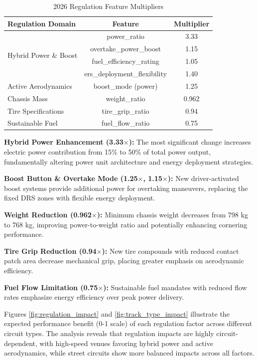 \documentclass[conference]{IEEEtran}
\begin{document}
\begin{table}[h]
\centering
\caption{2026 Regulation Feature Multipliers}
\begin{tabular}{lcc}
\toprule
\textbf{Regulation Domain} & \textbf{Feature} & \textbf{Multiplier} \\
\midrule
\multirow{4}{*}{Hybrid Power \& Boost} & power\_ratio & 3.33 \\
& overtake\_power\_boost & 1.15 \\
& fuel\_efficiency\_rating & 1.05 \\
& ers\_deployment\_flexibility & 1.40 \\
\midrule
Active Aerodynamics & boost\_mode (power) & 1.25 \\
\midrule
Chassis Mass & weight\_ratio & 0.962 \\
\midrule
Tire Specifications & tire\_grip\_ratio & 0.94 \\
\midrule
Sustainable Fuel & fuel\_flow\_ratio & 0.75 \\
\bottomrule
\end{tabular}
\label{tab:regulation_multipliers}
\end{table}

\textbf{Hybrid Power Enhancement (3.33$\times$):} The most significant change increases electric power contribution from 15\% to 50\% of total power output, fundamentally altering power unit architecture and energy deployment strategies.

\textbf{Boost Button \& Overtake Mode (1.25$\times$, 1.15$\times$):} New driver-activated boost systems provide additional power for overtaking maneuvers, replacing the fixed DRS zones with flexible energy deployment.

\textbf{Weight Reduction (0.962$\times$):} Minimum chassis weight decreases from 798 kg to 768 kg, improving power-to-weight ratio and potentially enhancing cornering performance.

\textbf{Tire Grip Reduction (0.94$\times$):} New tire compounds with reduced contact patch area decrease mechanical grip, placing greater emphasis on aerodynamic efficiency.

\textbf{Fuel Flow Limitation (0.75$\times$):} Sustainable fuel mandates with reduced flow rates emphasize energy efficiency over peak power delivery.

Figures \ref{fig:regulation_impact} and \ref{fig:track_type_impact} illustrate the expected performance benefit (0-1 scale) of each regulation factor across different circuit types. The analysis reveals that regulation impacts are highly circuit-dependent, with high-speed venues favoring hybrid power and active aerodynamics, while street circuits show more balanced impacts across all factors.
\end{document}
